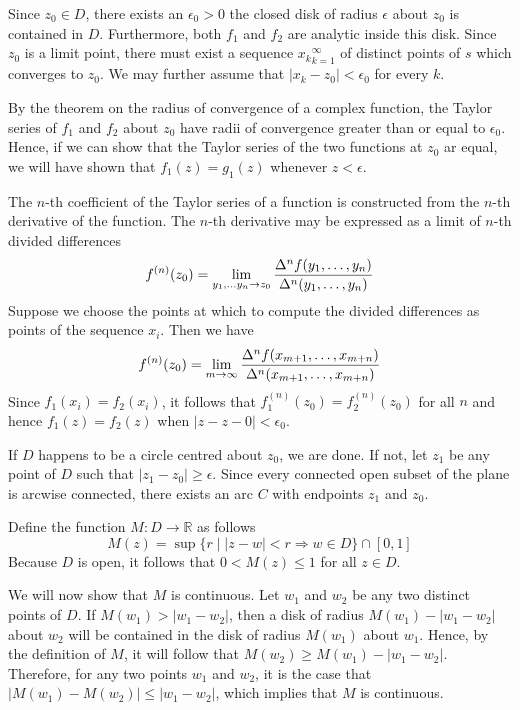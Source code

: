 \documentclass[12pt]{article}
\begin{document}
Since $z_0 \in D$, there exists an $\epsilon_0 > 0$ the closed disk of radius $\epsilon$ about $z_0$ is contained in $D$.  Furthermore, both $f_1$ and $f_2$
are analytic inside this disk.  Since $z_0$ is a limit point, there must exist a sequence ${x_k}_{k=1}^\infty$ of distinct points of $s$ which converges to $z_0$. We may further assume that $|x_k - z_0| < \epsilon_0$ for every $k$.

By the theorem on the radius of convergence of a complex function, the Taylor series of $f_1$ and $f_2$ about $z_0$ have radii of convergence greater than or equal to $\epsilon_0$.  Hence, if we can show that the Taylor series of the two functions at $z_0$ ar equal, we will have shown that $f_1(z) = g_1(z)$ whenever $z < \epsilon$.

The $n$-th coefficient of the Taylor series of a function is constructed from the $n$-th derivative of the function.  The $n$-th derivative may be expressed
as a limit of $n$-th divided differences
 $$f^{(n)}(z_0) = \lim_{y_1, \ldots y_n \to z_0} {\Delta^n f (y_1, \ldots, y_n) \over \Delta^n (y_1, \ldots, y_n)}$$
Suppose we choose the points at which to compute the divided differences as points of the sequence $x_i$.  Then we have
 $$f^{(n)}(z_0) = \lim_{m \to \infty} {\Delta^n f (x_{m+1}, \ldots, x_{m+n}) \over \Delta^n (x_{m+1}, \ldots, x_{m+n})}$$
Since $f_1(x_i) = f_2(x_i)$, it follows that $f_1^{(n)} (z_0) = f_2^{(n)} 
(z_0)$ for all $n$ and hence $f_1(z) = f_2 (z)$ when $|z - z-0| < \epsilon_0$.

If $D$ happens to be a circle centred about $z_0$, we are done.  If not, let $z_1$ be any point of $D$ such that $|z_1 - z_0| \ge \epsilon$.  Since every connected open subset of the plane is arcwise connected, there exists an arc 
$C$ with endpoints $z_1$ and $z_0$. 

Define the function $M \colon D \to \mathbb{R}$ as follows
 $$M(z) = \sup \{r \mid |z - w| < r \Rightarrow w \in D \} \cap [0,1]$$
Because $D$ is open, it follows that $0 < M(z) \le 1$ for all $z \in D$.

We will now show that $M$ is continuous.  Let $w_1$ and $w_2$ be any two distinct points of $D$.  If $M(w_1) > |w_1 - w_2|$, then a disk of radius $M(w_1) - |w_1 - w_2|$ about $w_2$ will be contained in the disk of radius $M(w_1)$ about $w_1$.  Hence, by the definition of $M$, it will follow that $M(w_2) \ge M(w_1) - |w_1 - w_2|$.  Therefore, for any two points $w_1$ and $w_2$, it is the case that $|M(w_1) - M(w_2)| \le |w_1 - w_2|$, which implies that $M$ is continuous.
\end{document}
